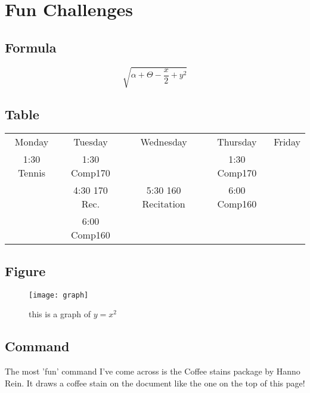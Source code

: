 \documentclass[12pt]{article}
\begin{document}
\pagebreak

\section{Fun Challenges}

\subsection{Formula}

$$ \sqrt{\alpha + \Theta - \frac{x}{2} + y^2} $$

\subsection{Table}

\begin{tabular}{|c|c|c|c|c|}
\hline
   Monday & Tuesday & Wednesday & Thursday & Friday \\
   1:30 Tennis & 1:30 Comp170 & & 1:30 Comp170  \\
   & 4:30 170 Rec. & 5:30 160 Recitation & 6:00 Comp160  \\ 
   & 6:00 Comp160 &   &\\ 
\hline
\end{tabular}

\subsection{Figure}

\begin{figure}[h]
\begin{center}
\texttt{[image: graph]}
\caption{this is a graph of $y = x^2$}
\label{ }
\end{center}
\end{figure}

\subsection{Command}

The most 'fun' command I've come across is the Coffee stains package by Hanno Rein. It draws a coffee stain on the document like the one on the top of this page!

\end{document}
